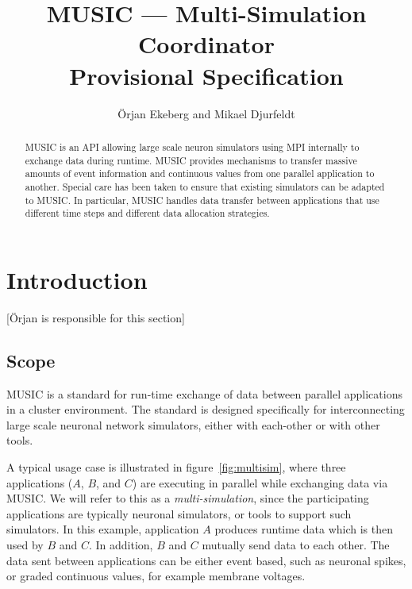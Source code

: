 \documentclass[a4paper]{report}
\newcommand{\responsible}[1]%
{{\color{red}[#1 is responsible for this section]}}
\begin{document}
\lstset{language=C++}

\title{MUSIC --- Multi-Simulation Coordinator\\
  Provisional Specification}

\author{Örjan Ekeberg and Mikael Djurfeldt}

\maketitle

\begin{abstract}
  MUSIC is an API allowing large scale neuron simulators using MPI
  internally to exchange data during runtime.  MUSIC provides
  mechanisms to transfer massive amounts of event information and
  continuous values from one parallel application to another.  Special
  care has been taken to ensure that existing simulators can be
  adapted to MUSIC.  In particular, MUSIC handles data transfer
  between applications that use different time steps and different
  data allocation strategies.
\end{abstract}


\tableofcontents

\chapter{Introduction}

\responsible{Örjan}

\section{Scope}

MUSIC is a standard for run-time exchange of data between parallel
applications in a cluster environment.  The standard is designed
specifically for interconnecting large scale neuronal network
simulators, either with each-other or with other tools.

A typical usage case is illustrated in figure~\ref{fig:multisim},
where three applications ($A$, $B$, and $C$) are executing in parallel
while exchanging data via MUSIC.  We will refer to this as a
\emph{multi-simulation}, since the participating applications are
typically neuronal simulators, or tools to support such simulators.
In this example, application $A$ produces runtime data which is then
used by $B$ and $C$.  In addition, $B$ and $C$ mutually send data to
each other.  The data sent between applications can be either event
based, such as neuronal spikes, or graded continuous values, for
example membrane voltages.
\end{document}
